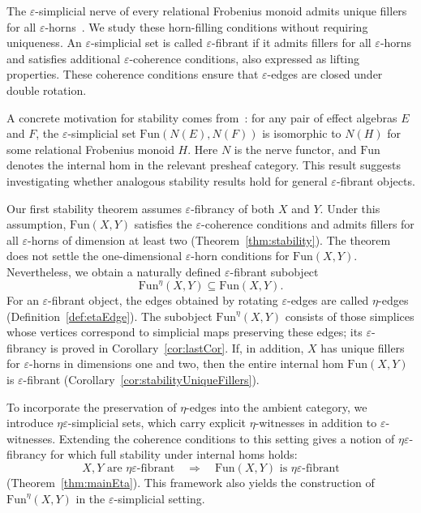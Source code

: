 \documentclass{article}
\theoremstyle{plain}
\theoremstyle{definition}
\theoremstyle{remark}
\begin{document}
The $\varepsilon$-simplicial nerve of every relational Frobenius monoid
admits unique fillers for all $\varepsilon$-horns~\cite{Lachman2026}.
We study these horn-filling conditions without requiring uniqueness.
An $\varepsilon$-simplicial set is called $\varepsilon$-fibrant if
it admits fillers for all $\varepsilon$-horns and satisfies additional
$\varepsilon$-coherence conditions, also expressed as lifting
properties. These coherence conditions ensure that $\varepsilon$-edges
are closed under double rotation.

A concrete motivation for stability comes
from~\cite[Theorem~4.1]{Lachman2025Simplicial}: for any pair of effect
algebras $E$ and $F$, the $\varepsilon$-simplicial set
$\mathrm{Fun}(N(E),N(F))$ is isomorphic to $N(H)$ for some relational
Frobenius monoid $H$. Here $N$ is the nerve functor, and
$\mathrm{Fun}$ denotes the internal hom in the relevant presheaf
category. This result suggests investigating whether analogous
stability results hold for general $\varepsilon$-fibrant objects.

Our first stability theorem assumes $\varepsilon$-fibrancy of both
$X$ and $Y$. Under this assumption, $\mathrm{Fun}(X,Y)$ satisfies
the $\varepsilon$-coherence conditions and admits fillers for all
$\varepsilon$-horns of dimension at least two
(Theorem~\ref{thm:stability}).
The theorem does not settle the one-dimensional
$\varepsilon$-horn conditions for $\mathrm{Fun}(X,Y)$.
Nevertheless, we obtain a naturally defined $\varepsilon$-fibrant
subobject
\[
    \mathrm{Fun}^{\eta}(X,Y)\subseteq\mathrm{Fun}(X,Y).
\]
For an $\varepsilon$-fibrant object, the edges obtained by rotating
$\varepsilon$-edges are called $\eta$-edges
(Definition~\ref{def:etaEdge}).
The subobject $\mathrm{Fun}^{\eta}(X,Y)$ consists of those simplices
whose vertices correspond to simplicial maps preserving these edges;
its $\varepsilon$-fibrancy is proved in Corollary~\ref{cor:lastCor}.
If, in addition, $X$ has unique fillers for $\varepsilon$-horns in
dimensions one and two, then the entire internal hom
$\mathrm{Fun}(X,Y)$ is $\varepsilon$-fibrant
(Corollary~\ref{cor:stabilityUniqueFillers}).

To incorporate the preservation of $\eta$-edges into the ambient
category, we introduce $\eta\varepsilon$-simplicial sets, which carry
explicit $\eta$-witnesses in addition to $\varepsilon$-witnesses.
Extending the coherence conditions to this setting gives a notion
of $\eta\varepsilon$-fibrancy for which full stability under internal
homs holds:
\[
    X,Y\text{ are }\eta\varepsilon\text{-fibrant}
    \quad\Longrightarrow\quad
    \mathrm{Fun}(X,Y)\text{ is }\eta\varepsilon\text{-fibrant}
\]
(Theorem~\ref{thm:mainEta}).
This framework also yields the construction of
$\mathrm{Fun}^{\eta}(X,Y)$ in the $\varepsilon$-simplicial setting.
\end{document}
